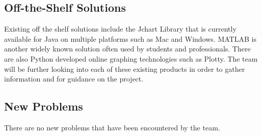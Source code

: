 \documentclass[12pt, titlepage]{article}
\begin{document}
\subsection{Off-the-Shelf Solutions}
Existing off the shelf solutions include the Jchart Library that is currently available for Java on multiple platforms such as Mac and Windows. MATLAB is another widely known solution often used by students and professionals. There are also Python developed online graphing technologies such as Plotty. The team will be further looking into each of these existing products in order to gather information and for guidance on the project. 
\subsection{New Problems}
There are no new problems that have been encountered by the team.
\newpage
\end{document}
